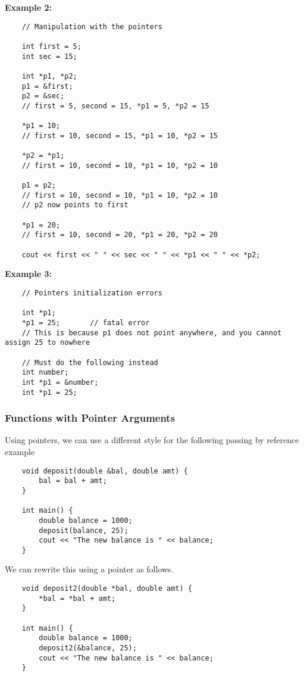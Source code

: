 \documentclass[]{article}
\begin{document}
\textbf{Example 2:}

\begin{lstlisting}
	// Manipulation with the pointers
	
	int first = 5;
	int sec = 15;
	
	int *p1, *p2;
	p1 = &first;
	p2 = &sec;
	// first = 5, second = 15, *p1 = 5, *p2 = 15
	
	*p1 = 10;
	// first = 10, second = 15, *p1 = 10, *p2 = 15
	
	*p2 = *p1;
	// first = 10, second = 10, *p1 = 10, *p2 = 10
	
	p1 = p2;
	// first = 10, second = 10, *p1 = 10, *p2 = 10
	// p2 now points to first
	
	*p1 = 20;
	// first = 10, second = 20, *p1 = 20, *p2 = 20
	
	cout << first << " " << sec << " " << *p1 << " " << *p2;
\end{lstlisting}\bigbreak

\textbf{Example 3:}

\begin{lstlisting}
	// Pointers initialization errors
	
	int *p1;
	*p1 = 25; 		// fatal error
	// This is because p1 does not point anywhere, and you cannot assign 25 to nowhere
	
	// Must do the following instead
	int number; 
	int *p1 = &number;
	int *p1 = 25;
\end{lstlisting}\bigbreak

\subsubsection{Functions with Pointer Arguments}
\bigbreak

Using pointers, we can use a different style for the following passing by reference example

\begin{lstlisting}
	void deposit(double &bal, double amt) {
		bal = bal + amt;
	}

	int main() {
		double balance = 1000;
		deposit(balance, 25);
		cout << "The new balance is " << balance;
	}
\end{lstlisting}\bigbreak

We can rewrite this using a pointer as follows.

\begin{lstlisting}
	void deposit2(double *bal, double amt) {
		*bal = *bal + amt;
	}
	
	int main() {
		double balance = 1000;
		deposit2(&balance, 25);
		cout << "The new balance is " << balance;
	}
\end{lstlisting}\bigbreak
\end{document}
